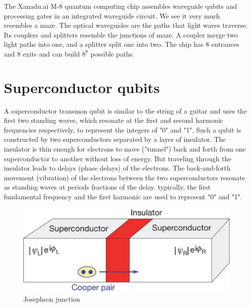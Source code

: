\documentclass[oneside, letter, 12pt]{book}
\begin{document}
The Xanadu.ai M-8 quantum computing chip assembles waveguide qubits and processing gates in an integrated waveguide circuit. We see it very much resembles a maze. The optical waveguides are the paths that light waves traverse. Its couplers and splitters resemble the junctions of maze. A coupler merge two light paths into one, and a splitter split one into two. The chip has 8 entrances and 8 exits and can build $8^8$ possible paths.

\section{Superconductor qubits}
A superconductor transmon qubit is similar to the string of a guitar and uses the first two standing waves, which resonate at the first and second harmonic frequencies respectively, to represent the integers of "0" and "1". Such a qubit is constructed by two superconductors separated by a layer of insulator. The insulator is thin enough for electrons to move ("tunnel") back and forth from one superconductor to another without loss of energy. But traveling through the insulator leads to delays (phase delays) of the electrons. The back-and-forth movement (vibration) of the electrons between the two superconductors resonate as standing waves at periods fractions of the delay. typically, the first fundamental frequency and the first harmonic are used to represent "0" and "1".
\begin{figure}[h]
\includegraphics[width=12cm]{pic/supercQubit.jpg}
\caption{Josephson junction}
\label{Superconductor}
\end{figure}
\end{document}
